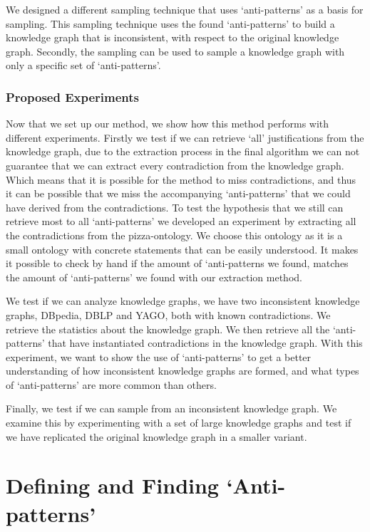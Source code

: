\documentclass[11pt,letterpaper ,oneside ]{book}
\begin{document}
	We designed a different sampling technique that uses `anti-patterns' as a basis for sampling. This sampling technique uses the found `anti-patterns' to build a knowledge graph that is inconsistent, with respect to the original knowledge graph. Secondly, the sampling can be used to sample a knowledge graph with only a specific set of `anti-patterns'.
	
	\subsection{Proposed Experiments}
	Now that we set up our method, we show how this method performs with different experiments. 
	Firstly we test if we can retrieve `all' justifications from the knowledge graph, due to the extraction process in the final algorithm we can not guarantee that we can extract every contradiction from the knowledge graph. Which means that it is possible for the method to miss contradictions, and thus it can be possible that we miss the accompanying `anti-patterns' that we could have derived from the contradictions. To test the hypothesis that we still can retrieve most to all `anti-patterns' we developed an experiment by extracting all the contradictions from the pizza-ontology. We choose this ontology as it is a small ontology with concrete statements that can be easily understood. It makes it possible to check by hand if the amount of `anti-patterns we found, matches the amount of `anti-patterns' we found with our extraction method.
	
	We test if we can analyze knowledge graphs, we have two inconsistent knowledge graphs, DBpedia, DBLP and YAGO, both with known contradictions. We retrieve the statistics about the knowledge graph. We then retrieve all the `anti-patterns' that have instantiated contradictions in the knowledge graph. 
	With this experiment, we want to show the use of `anti-patterns' to get a better understanding of how inconsistent knowledge graphs are formed, and what types of `anti-patterns' are more common than others.
	
	Finally, we test if we can sample from an inconsistent knowledge graph. We examine this by experimenting with a set of large knowledge graphs and test if we have replicated the original knowledge graph in a smaller variant.
	
	\newpage
	\chapter{Defining and Finding `Anti-patterns'}\label{Method}
\end{document}
